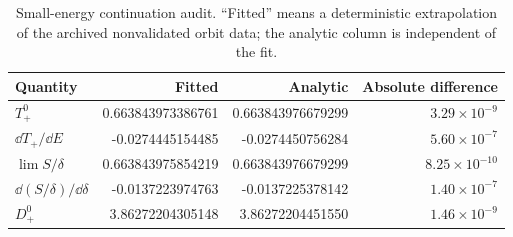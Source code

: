 \begin{table}[t]
\centering
\caption{Small-energy continuation audit.  ``Fitted'' means a deterministic
extrapolation of the archived nonvalidated orbit data; the analytic column
is independent of the fit.}
\label{tab:r400-oracle}
\small
\begin{tabular}{@{}lrrr@{}}
\toprule
Quantity & Fitted & Analytic & Absolute difference\\
\midrule
\(T_+^0\) & 0.663843973386761 & 0.663843976679299 & \(3.29\times10^{-9}\)\\
\(\dd T_+/\dd E\) & -0.0274445154485 & -0.0274450756284 & \(5.60\times10^{-7}\)\\
\(\lim S/\delta\) & 0.663843975854219 & 0.663843976679299 & \(8.25\times10^{-10}\)\\
\(\dd(S/\delta)/\dd\delta\) & -0.0137223974763 & -0.0137225378142 & \(1.40\times10^{-7}\)\\
\(D_+^0\) & 3.86272204305148 & 3.86272204451550 & \(1.46\times10^{-9}\)\\
\bottomrule
\end{tabular}
\end{table}
